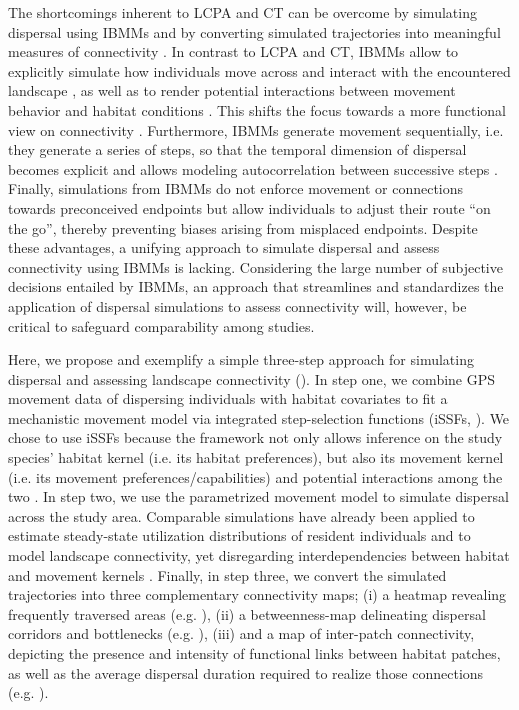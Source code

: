\documentclass[../FinalThesis.tex]{subfiles}
\begin{document}
The shortcomings inherent to LCPA and CT can be overcome by simulating dispersal
using IBMMs and by converting simulated trajectories into meaningful measures of
connectivity \citep{Diniz.2019}. In contrast to LCPA and CT, IBMMs allow to
explicitly simulate how individuals move across and interact with the
encountered landscape \citep{Kanagaraj.2013, Clark.2015, Allen.2016,
Hauenstein.2019, Zeller.2020}, as well as to render potential interactions
between movement behavior and habitat conditions \citep{Avgar.2016}. This shifts
the focus towards a more functional view on connectivity
\citep{Tischendorf.2000}. Furthermore, IBMMs generate movement sequentially,
i.e. they generate a series of steps, so that the temporal dimension of
dispersal becomes explicit and allows modeling autocorrelation between
successive steps \citep{Diniz.2019}. Finally, simulations from IBMMs do not
enforce movement or connections towards preconceived endpoints but allow
individuals to adjust their route  ``on the go'', thereby preventing biases
arising from misplaced endpoints. Despite these advantages, a unifying approach
to simulate dispersal and assess connectivity using IBMMs is lacking.
Considering the large number of subjective decisions entailed by IBMMs, an
approach that streamlines and standardizes the application of dispersal
simulations to assess connectivity will, however, be critical to safeguard
comparability among studies.

Here, we propose and exemplify a simple three-step approach for simulating
dispersal and assessing landscape connectivity (). In
step one, we combine GPS movement data of dispersing individuals with habitat
covariates to fit a mechanistic movement model via integrated step-selection
functions (iSSFs, \citealp{Avgar.2016}). We chose to use iSSFs because the
framework not only allows inference on the study species' habitat kernel (i.e.
its habitat preferences), but also its movement kernel (i.e. its movement
preferences/capabilities) and potential interactions among the two
\citep{Avgar.2016, Fieberg.2021}. In step two, we use the parametrized movement
model to simulate dispersal across the study area. Comparable simulations have
already been applied to estimate steady-state utilization distributions of
resident individuals \citep{Potts.2013, Signer.2017} and to model landscape
connectivity, yet disregarding interdependencies between habitat and movement
kernels \citep{Clark.2015, Zeller.2020}. Finally, in step three, we convert the
simulated trajectories into three complementary connectivity maps; (i) a heatmap
revealing frequently traversed areas (e.g. \citealp{Hauenstein.2019,
Zeller.2020}), (ii) a betweenness-map delineating dispersal corridors and
bottlenecks (e.g. \citealp{Bastille-Rousseau.2018}), (iii) and a map of
inter-patch connectivity, depicting the presence and intensity of functional
links between habitat patches, as well as the average dispersal duration
required to realize those connections (e.g. \citealp{Gustafson.1996,
Kanagaraj.2013}).
\end{document}
